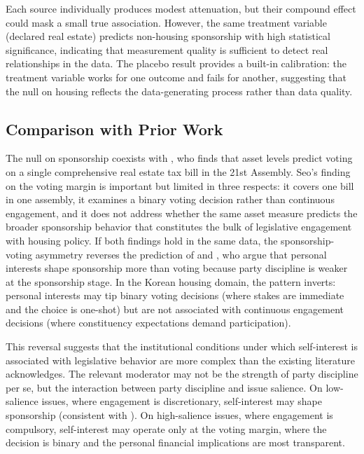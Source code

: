 \documentclass[11pt]{article}
\begin{document}
Each source individually produces modest attenuation, but their compound effect could mask a small true association. However, the same treatment variable (declared real estate) predicts non-housing sponsorship with high statistical significance, indicating that measurement quality is sufficient to detect real relationships in the data. The placebo result provides a built-in calibration: the treatment variable works for one outcome and fails for another, suggesting that the null on housing reflects the data-generating process rather than data quality.

\subsection{Comparison with Prior Work}

The null on sponsorship coexists with \citet{seo2025}, who finds that asset levels predict voting on a single comprehensive real estate tax bill in the 21st Assembly. Seo's finding on the voting margin is important but limited in three respects: it covers one bill in one assembly, it examines a binary voting decision rather than continuous engagement, and it does not address whether the same asset measure predicts the broader sponsorship behavior that constitutes the bulk of legislative engagement with housing policy. If both findings hold in the same data, the sponsorship-voting asymmetry reverses the prediction of \citet{lupu2015} and \citet{pontusson2015}, who argue that personal interests shape sponsorship more than voting because party discipline is weaker at the sponsorship stage. In the Korean housing domain, the pattern inverts: personal interests may tip binary voting decisions (where stakes are immediate and the choice is one-shot) but are not associated with continuous engagement decisions (where constituency expectations demand participation).

This reversal suggests that the institutional conditions under which self-interest is associated with legislative behavior are more complex than the existing literature acknowledges. The relevant moderator may not be the strength of party discipline per se, but the interaction between party discipline and issue salience. On low-salience issues, where engagement is discretionary, self-interest may shape sponsorship (consistent with \citealt{lupu2015}). On high-salience issues, where engagement is compulsory, self-interest may operate only at the voting margin, where the decision is binary and the personal financial implications are most transparent.
\end{document}
